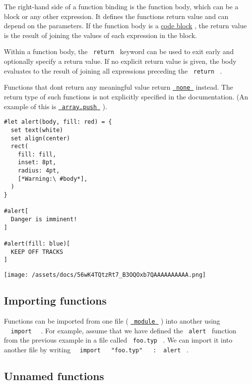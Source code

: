 The right-hand side of a function binding is the function body, which
can be a block or any other expression. It defines the
function\textquotesingle s return value and can depend on the
parameters. If the function body is a
\href{/docs/reference/scripting/\#blocks}{code block} , the return value
is the result of joining the values of each expression in the block.

Within a function body, the \texttt{\ return\ } keyword can be used to
exit early and optionally specify a return value. If no explicit return
value is given, the body evaluates to the result of joining all
expressions preceding the \texttt{\ return\ } .

Functions that don\textquotesingle t return any meaningful value return
\href{/docs/reference/foundations/none/}{\texttt{\ none\ }} instead. The
return type of such functions is not explicitly specified in the
documentation. (An example of this is
\href{/docs/reference/foundations/array/\#definitions-push}{\texttt{\ array.push\ }}
).

\begin{verbatim}
#let alert(body, fill: red) = {
  set text(white)
  set align(center)
  rect(
    fill: fill,
    inset: 8pt,
    radius: 4pt,
    [*Warning:\ #body*],
  )
}

#alert[
  Danger is imminent!
]

#alert(fill: blue)[
  KEEP OFF TRACKS
]
\end{verbatim}

\texttt{[image: /assets/docs/56wK4TQtzRt7\_B3OQOxb7QAAAAAAAAAA.png]}

\subsection{Importing functions}\label{importing-functions}

Functions can be imported from one file (
\href{/docs/reference/scripting/\#modules}{\texttt{\ module\ }} ) into
another using \texttt{\ }{\texttt{\ import\ }}\texttt{\ } . For example,
assume that we have defined the \texttt{\ alert\ } function from the
previous example in a file called \texttt{\ foo.typ\ } . We can import
it into another file by writing
\texttt{\ }{\texttt{\ import\ }}\texttt{\ }{\texttt{\ "foo.typ"\ }}\texttt{\ }{\texttt{\ :\ }}\texttt{\ alert\ }
.

\subsection{Unnamed functions}\label{unnamed}

